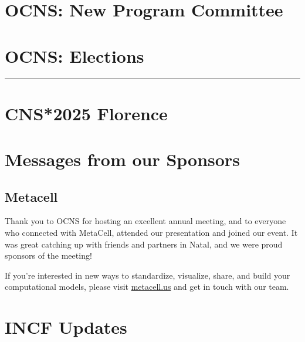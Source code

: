 \documentclass[11pt,a4paper,oneside]{article}
\begin{document}
\newpage
\section*{OCNS: New Program Committee}%
\lipsum[1-3]

\newpage
\section*{OCNS: Elections}%
\rule{\textwidth}{0.4pt}
\lipsum[1-3]

\newpage
\section*{CNS*2025 Florence}%
\lipsum[1-3]

\newpage

\newpage

\newpage
\section*{Messages from our Sponsors}%
\subsection*{Metacell}%
\begin{displayquote}
  Thank you to OCNS for hosting an excellent annual meeting, and to everyone who connected with MetaCell, attended our presentation and joined our event.
  It was great catching up with friends and partners in Natal, and we were proud sponsors of the meeting!

  If you're interested in new ways to standardize, visualize, share, and build your computational models, please visit \url{metacell.us} and get in touch with our team.
\end{displayquote}

\newpage
\section*{INCF Updates}%
\lipsum[1-3]
\end{document}
